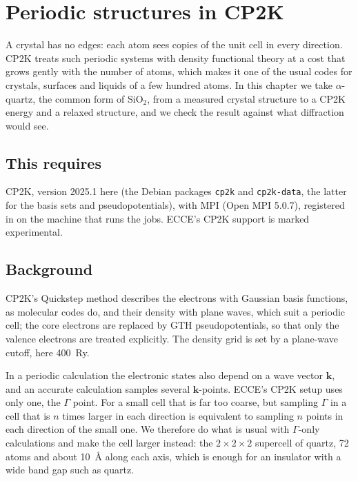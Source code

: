 \chapter{Periodic structures in CP2K}
\label{ch:cp2k}

A crystal has no edges: each atom sees copies of the unit cell in every direction. CP2K treats such periodic systems with density functional theory at a cost that grows gently with the number of atoms, which makes it one of the usual codes for crystals, surfaces and liquids of a few hundred atoms. In this chapter we take $\alpha$-quartz, the common form of SiO$_2$, from a measured crystal structure to a CP2K energy and a relaxed structure, and we check the result against what diffraction would see.

\section*{This requires}
CP2K, version 2025.1 here (the Debian packages \texttt{cp2k} and \texttt{cp2k-data}, the latter for the basis sets and pseudopotentials), with MPI (Open MPI 5.0.7), registered in  on the machine that runs the jobs. ECCE's CP2K support is marked experimental.

\section{Background}
CP2K's Quickstep method describes the electrons with Gaussian basis functions, as molecular codes do, and their density with plane waves, which suit a periodic cell; the core electrons are replaced by GTH pseudopotentials, so that only the valence electrons are treated explicitly. The density grid is set by a plane-wave cutoff, here 400~Ry.

In a periodic calculation the electronic states also depend on a wave vector $\mathbf{k}$, and an accurate calculation samples several $\mathbf{k}$-points. ECCE's CP2K setup uses only one, the $\Gamma$ point. For a small cell that is far too coarse, but sampling $\Gamma$ in a cell that is $n$ times larger in each direction is equivalent to sampling $n$ points in each direction of the small one. We therefore do what is usual with $\Gamma$-only calculations and make the cell larger instead: the $2 \times 2 \times 2$ supercell of quartz, 72 atoms and about \SI{10}{\angstrom} along each axis, which is enough for an insulator with a wide band gap such as quartz.

